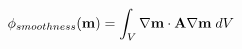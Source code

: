 \vspace{-0.1cm}
\begin{equation}
    \phi_{smoothness}(\mathbf{m}) = \int_{V} \nabla \mathbf{m} \cdot \mathbf{A} \nabla \mathbf{m} \;dV
    \label{eq:forward-pass}
    \vspace{-0.05cm}
\end{equation}